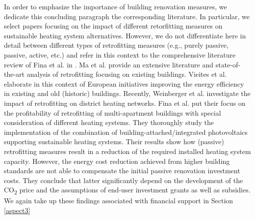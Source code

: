 In order to emphasize the importance of building renovation measures, we dedicate this concluding paragraph the corresponding literature. In particular, we select papers focusing on the impact of different retorfitting measures on sustainable heating system alternatives. However, we do not differentiate here in detail between different types of retrofitting measures (e.g., purely passive, passive, active, etc.) and refer in this context to the comprehensive literature review of Fina et al. in \cite{fina2019profitability}. Ma et al. \cite{ma2012existing} provide an extensive literature and state-of-the-art analysis of retrofitting focusing on existing buildings. Vieites et al. \cite{vieites2015european} elaborate in this context of European initiatives improving  the energy efficiency in existing and old (historic) buildings. Recently, Weinberger et al. \cite{weinberger2021investigating} investigate the impact of retrofitting on district heating networks. Fina et al. \cite{fina2019profitability} put their focus on the profitability of retrofitting of multi-apartment buildings with special consideration of different heating systems. They thoroughly study the implementation of the combination of building-attached/integrated photovoltaics supporting sustainable heating systems. Their results show how (passive) retrofitting measures result in a reduction of the required installed heating system capacity. However, the energy cost reduction achieved from higher building standards are not able to compensate the initial passive renovation investment costs. They conclude that latter significantly depend on the development of the CO\textsubscript{2} price and the assumptions of end-user investment grants as well as subsidies. We again take up these findings associated with financial support in Section \ref{aspect3}

